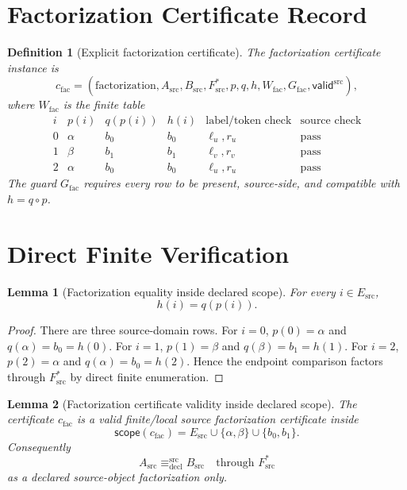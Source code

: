 \documentclass[11pt]{article}
\newcommand{\Esrc}{E_{\mathrm{src}}}
\newcommand{\Fsrc}{F_{\mathrm{src}}}
\newcommand{\Asrc}{A_{\mathrm{src}}}
\newcommand{\Bsrc}{B_{\mathrm{src}}}
\newcommand{\Scope}{\mathsf{scope}}
\newcommand{\Valid}{\mathsf{valid}^{\mathrm{src}}}
\newcommand{\DeclEq}{\equiv_{\mathrm{decl}}^{\mathrm{src}}}
\newtheorem{definition}{Definition}
\newtheorem{lemma}{Lemma}
\begin{document}
\section{Factorization Certificate Record}

\begin{definition}[Explicit factorization certificate]
The factorization certificate instance is
\[
  c_{\mathrm{fac}}=
  (\mathrm{factorization},\Asrc,\Bsrc,\Fsrc^{\ast},p,q,h,
  W_{\mathrm{fac}},G_{\mathrm{fac}},\Valid),
\]
where \(W_{\mathrm{fac}}\) is the finite table
\[
\begin{array}{c|c|c|c|c|c}
i & p(i) & q(p(i)) & h(i) & \text{label/token check} & \text{source check}\\
\hline
0 & \alpha & b_0 & b_0 & \ell_u,r_u & \mathrm{pass}\\
1 & \beta & b_1 & b_1 & \ell_v,r_v & \mathrm{pass}\\
2 & \alpha & b_0 & b_0 & \ell_u,r_u & \mathrm{pass}
\end{array}
\]
The guard \(G_{\mathrm{fac}}\) requires every row to be present, source-side,
and compatible with \(h=q\circ p\).
\end{definition}

\section{Direct Finite Verification}

\begin{lemma}[Factorization equality inside declared scope]
For every \(i\in\Esrc\),
\[
  h(i)=q(p(i)).
\]
\end{lemma}

\begin{proof}
There are three source-domain rows. For \(i=0\), \(p(0)=\alpha\) and
\(q(\alpha)=b_0=h(0)\). For \(i=1\), \(p(1)=\beta\) and
\(q(\beta)=b_1=h(1)\). For \(i=2\), \(p(2)=\alpha\) and
\(q(\alpha)=b_0=h(2)\). Hence the endpoint comparison factors through
\(\Fsrc^{\ast}\) by direct finite enumeration.
\end{proof}

\begin{lemma}[Factorization certificate validity inside declared scope]
The certificate \(c_{\mathrm{fac}}\) is a valid finite/local source
factorization certificate inside
\[
  \Scope(c_{\mathrm{fac}})=\Esrc\cup\{\alpha,\beta\}\cup\{b_0,b_1\}.
\]
Consequently
\[
  \Asrc \DeclEq \Bsrc \quad\text{through }\Fsrc^{\ast}
\]
as a declared source-object factorization only.
\end{lemma}
\end{document}
